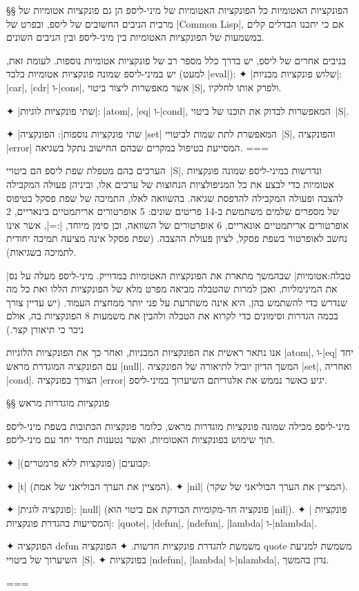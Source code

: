 §§ הפונקציות האטומיות
כל הפונקציות האטומיות של מיני-ליספ הן גם פונקציות אטומיות של מרבית הניבים
החשובים של ליספ, ובפרט של \E|Common Lisp|, אם כי יתכנו הבדלים קלים במשמעות של
הפונקציות האטומיות בין מיני-ליספ ובין הניבים השונים.

בניבים אחרים של ליספ, יש בדרך כלל מספר רב של פונקציות אטומיות נוספות. לעומת
זאת, יש במיני-ליספ שמונה פונקציות אטומיות בלבד (למעט \E|eval|):
✦ \ע|שלוש פונקציות מבניות|: \E|car|, \E|cdr| ו-\E|cons|, אשר מאפשרות ליצור ביטוי
\E|S|, ולפרק אותו לחלקיו.

✦ \ע|שתי פונקציות לוגיות|: \E|atom|, \E|eq| ו-\E|cond|, המאפשרות לבדוק את תוכנו של
ביטוי~\E|S|.

✦ \ע|שתי פונקציות נוספות|: הפונקציה \E|set| המאפשרת לתת שמות לביטויי~\E|S|,
והפונקציה \E|error| המסייעת בטיפול במקרים שבהם החישוב נתקל בשגיאה.
===

הערכים בהם מטפלת שפת ליספ הם ביטויי~\E|S|, ונדרשות במיני-ליספ שמונה פונקציות
אטומיות כדי לבצע את כל המניפולציות הנחוצות של ערכים אלו, וביניהן פעולה המקבילה
להצבה ופעולה המקבילה להדפסת שגיאה. בהשוואה לאלו, התמיכה של שפת פסקל בטיפוס של
מספרים שלמים משתמשת ב-14 פריטים שונים: 5 אופרטורים אריתמטיים בינאריים, 2
אופרטורים אריתמטיים אונאריים, 6 אופרטורים של השוואה, וכן סימן מיוחד, \E|:=|,
אשר אינו נחשב לאופרטור בשפת פסקל, לציון פעולת ההצבה. (שפת פסקל אינה מציעה תמיכה
יחודית לתמיכה בשגיאות).

|טבלה:אטומיות| שבהמשך מתארת את הפונקציות האטומיות במדוייק. מיני-ליספ מעלה
על נס את המינימליות, ואכן למרות שהטבלה מביאה מפרט מלא של הפונקציות הללו ואת כל
מה שנדרש כדי להשתמש בהן, היא אינה משתרעת על פני יותר ממחצית העמוד. (יש עדיין
צורך בכמה הגדרות וסימונים כדי לקרוא את הטבלה ולהבין את משמעות 8 הפונקציות בה,
אולם ניכר כי תיאורן קצר.)

אנו נתאר ראשית את הפונקציות המבניות, ואחר כך את הפונקציות הלוגיות \E|atom|,
ו-\E|eq| יחד עם הפונקציה המוגדרת מראש \E|null|. המשך הדיון יוביל לתיאורה של
הפונקציה \E|set|, ואחריה \E|cond|. הצורך בפונקציה \E|error| יגיע כאשר נממש את
אלגוריתם השיערוך במיני-ליספ.

§§ פונקציות מוגדרות מראש

מיני-ליספ מכילה שמונה פונקציות מוגדרות מראש, כלומר פונקציות הכתובות
בשפת מיני-ליספ תוך שימוש בפונקציות האטומיות, ואשר נטענות תמיד יחד עם
מיני-ליספ.

✦ \ע|קבועים| (פונקציות ללא פרמטרים):
\begin{itemize}
  ✦ \E|t| (המציין את הערך הבוליאני של אמת).
  ✦ \E|nil| (המציין את הערך הבוליאני של שקר).
\end{itemize}
✦ \ע|פונקציה לוגית|: \E|null| (פונקציה חד-מקומיות הבודקת אם ביטוי הוא \E|nil|).
✦ \ע| פונקציות המסייעות בהגדרת פונקציות|:
\E|quote|, \E|defun|, \E|ndefun|, \E|lambda| ו-\E|nlambda|.
\begin{itemize}
  ✦ הפונקציה defun משמשת להגדרת פונקציות חדשות.
  ✦ הפונקציה quote משמשת למניעת השיערוך של ביטויי~\E|S|.
  ✦ בפונקציות \E|ndefun|, \E|lambda| ו-\E|nlambda|, נדון בהמשך.
\end{itemize}
===

